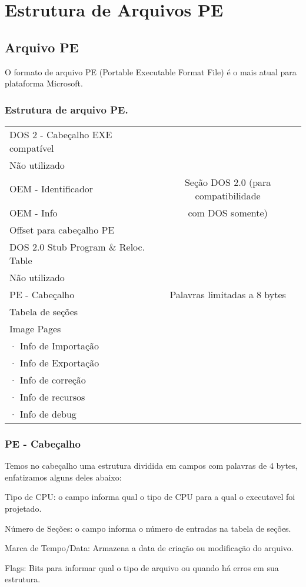 \chapter{Estrutura de Arquivos PE}

\section{Arquivo PE}

O formato de arquivo PE (Portable Executable Format File) é o mais atual para plataforma Microsoft.


\subsection{Estrutura de arquivo PE.}
\begin{list}{}
\item {\begin{tabular}{|l|c|}
\hline 
DOS 2 - Cabeçalho EXE compatível  & \tabularnewline
\cline{1-1} 
Não utilizado  & \tabularnewline
\cline{1-1} 
OEM - Identificador  & Seção DOS 2.0 (para compatibilidade \tabularnewline
OEM - Info  & com DOS somente)\tabularnewline
Offset para cabeçalho PE & \tabularnewline
\cline{1-1} 
DOS 2.0 Stub Program \& Reloc. Table  & \tabularnewline
\hline 
Não utilizado & \tabularnewline
\hline 
PE - Cabeçalho & Palavras limitadas a 8 bytes\tabularnewline
\hline 
Tabela de seções & \tabularnewline
\hline
Image Pages  & \tabularnewline
· Info de Importação & \tabularnewline
· Info de Exportação  & \tabularnewline
· Info de correção & \tabularnewline
· Info de recursos & \tabularnewline
· Info de debug & \tabularnewline
\hline
\end{tabular}}
\end{list}

\subsection{PE - Cabeçalho}


Temos no cabeçalho uma estrutura dividida em campos com palavras
de 4 bytes, enfatizamos alguns deles abaixo:


Tipo de CPU: o campo informa qual o tipo de CPU para a qual o executavel
foi projetado.


Número de Seções: o campo informa o número de entradas na tabela
de seções.


Marca de Tempo/Data: Armazena a data de criação ou modificação do
arquivo.


Flags: Bits para informar qual o tipo de arquivo ou quando há erros
em sua estrutura.


